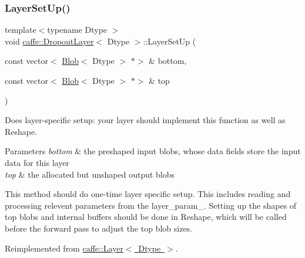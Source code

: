 \mbox{\label{classcaffe_1_1_dropout_layer_addcfd0822c1c5e3591bc7001a034b167}} 
\subsubsection{\texorpdfstring{Layer\+Set\+Up()}{LayerSetUp()}\hspace{0.1cm}{\footnotesize\ttfamily [2/2]}}
{\footnotesize\ttfamily template$<$typename Dtype $>$ \\
void \mbox{\hyperlink{classcaffe_1_1_dropout_layer}{caffe\+::\+Dropout\+Layer}}$<$ Dtype $>$\+::Layer\+Set\+Up (\begin{DoxyParamCaption}\item[{const vector$<$ \mbox{\hyperlink{classcaffe_1_1_blob}{Blob}}$<$ Dtype $>$ $\ast$$>$ \&}]{bottom,  }\item[{const vector$<$ \mbox{\hyperlink{classcaffe_1_1_blob}{Blob}}$<$ Dtype $>$ $\ast$$>$ \&}]{top }\end{DoxyParamCaption})\hspace{0.3cm}{\ttfamily [virtual]}}



Does layer-\/specific setup\+: your layer should implement this function as well as Reshape. 


\begin{DoxyParams}{Parameters}
{\em bottom} & the preshaped input blobs, whose data fields store the input data for this layer \\
\hline
{\em top} & the allocated but unshaped output blobs\\
\hline
\end{DoxyParams}
This method should do one-\/time layer specific setup. This includes reading and processing relevent parameters from the {\ttfamily layer\+\_\+param\+\_\+}. Setting up the shapes of top blobs and internal buffers should be done in {\ttfamily Reshape}, which will be called before the forward pass to adjust the top blob sizes. 

Reimplemented from \mbox{\hyperlink{classcaffe_1_1_layer_a481323a3e0972c682787f2137468c29f}{caffe\+::\+Layer$<$ Dtype $>$}}.

